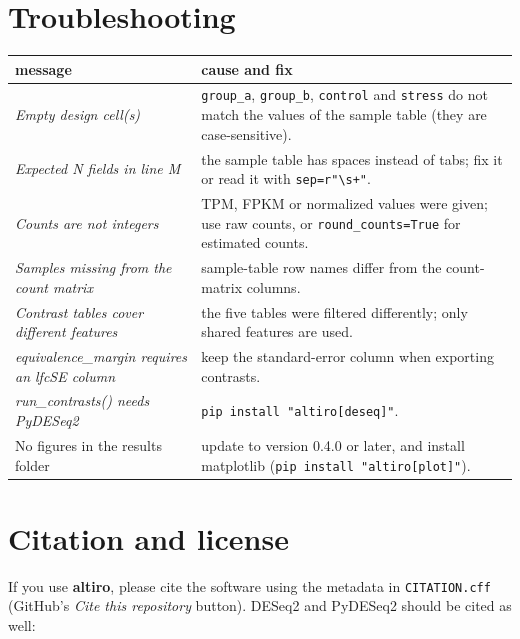 \documentclass[11pt,a4paper]{article}
\newcommand{\code}[1]{\texttt{\color{navy!85!black}#1}}
\newcommand{\pkg}{\textsf{\bfseries altiro}}
\begin{document}
\section{Troubleshooting}

\begin{center}
\small
\begin{tabularx}{\linewidth}{>{\raggedright\arraybackslash}p{5.2cm} Y}
\toprule
\textsf{\textbf{message}} & \textsf{\textbf{cause and fix}}\\
\midrule
\emph{Empty design cell(s)} & \code{group\_a}, \code{group\_b}, \code{control} and \code{stress} do not match
the values of the sample table (they are case-sensitive).\\
\emph{Expected N fields in line M} & the sample table has spaces instead of tabs; fix it or read it with
\code{sep=r"\textbackslash{}s+"}.\\
\emph{Counts are not integers} & TPM, FPKM or normalized values were given; use raw counts, or
\code{round\_counts=True} for estimated counts.\\
\emph{Samples missing from the count matrix} & sample-table row names differ from the count-matrix columns.\\
\emph{Contrast tables cover different features} & the five tables were filtered differently; only shared
features are used.\\
\emph{equivalence\_margin requires an lfcSE column} & keep the standard-error column when exporting contrasts.\\
\emph{run\_contrasts() needs PyDESeq2} & \code{pip install "altiro[deseq]"}.\\
No figures in the results folder & update to version 0.4.0 or later, and install matplotlib
(\code{pip install "altiro[plot]"}).\\
\bottomrule
\end{tabularx}
\end{center}

\section{Citation and license}

If you use \pkg{}, please cite the software using the metadata in \code{CITATION.cff}
(GitHub's \emph{Cite this repository} button). DESeq2 and PyDESeq2 should be cited as well:
\end{document}
